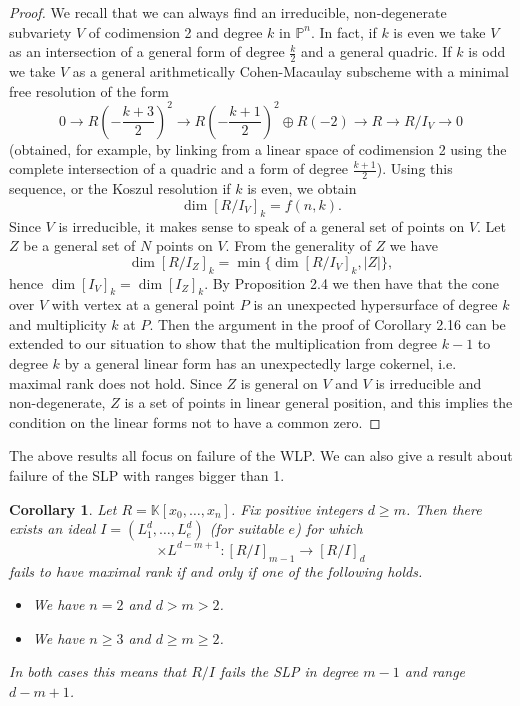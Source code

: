 \documentclass[12pt]{amsart}
\numberwithin{equation}{section}
\newtheorem{corollary}[theorem]{Corollary}
\theoremstyle{definition}
\newcommand{\PP}{ \ensuremath{\mathbb{P}}}
\newcommand{\KK}{ \ensuremath{\mathbb{K}}}
\begin{document}
\begin{proof}
We recall that we can always find an irreducible, non-degenerate subvariety $V$  of codimension 2 and degree $k$ in $\PP^n$. 
In fact, if $k$ is even we take $V$ as an intersection of a general form of degree $\frac{k}{2}$ and a general quadric. If $k$ is odd we 
take $V$ as a general arithmetically Cohen-Macaulay subscheme with a minimal free resolution of the form 
\[
0 \rightarrow R(- {\textstyle \frac{k+3}{2} })^2 \rightarrow R(- {\textstyle \frac{k+1}{2} })^2 \oplus R(-2) \rightarrow R \rightarrow R/I_V \rightarrow 0
\]
(obtained, for example, by linking from a linear space of codimension 2 using the complete intersection of a quadric and a form of degree $\frac{k+1}{2}$). 
Using this sequence, or the Koszul resolution if $k$ is even, we obtain
\[
\dim [R/I_V]_k = f (n, k).
\]
Since $V$ is irreducible, it makes sense to speak of a general set of points on $V$. Let $Z$ be a general set of $N$ points on $V$. From the generality of $Z$ we have
\[
\dim [R/I_Z]_k = \min \{ \dim [R/I_V]_k , |Z| \},
\]
hence $\dim [I_V]_k = \dim [I_Z]_k$. By Proposition 2.4 we then have that the cone over $V$ with vertex at a general point $P$ is an unexpected hypersurface of degree $k$ and multiplicity $k$ at $P$.
Then the argument in the proof of Corollary 2.16 can be extended to our situation to show that the multiplication from degree $k-1$ to 
degree $k$ by a general linear form has an unexpectedly large cokernel, i.e. maximal rank does not hold. Since $Z$ is general on $V$ 
and $V$ is irreducible and non-degenerate, $Z$ is a set of points in linear general position, and this implies the  condition on the linear forms not to have a common zero.
\end{proof}

The above results all focus on failure of the WLP. We can also give a result about failure of the SLP with ranges
bigger than 1.

\begin{corollary} \label{fail SLP}
Let $R = \KK[x_0,\dots,x_n]$. Fix positive integers $d\geq m$. Then there exists an ideal $I = (L_1^d,\dots, L_e^d)$ (for suitable $e$) for which
\[
\times L^{d-m+1} : [R/I]_{m-1} \rightarrow [R/I]_d
\]
fails to have maximal rank if and only if one of the following holds.
\begin{itemize}

\item[(i)] We have $n = 2$ and $d > m > 2$.

\item[(ii)] We have $n \geq 3$ and $d \geq m \geq 2$.

\end{itemize}
In both cases this means that $R/I$ fails the SLP in degree $m-1$ and range $d-m+1$.
\end{corollary}
\end{document}
